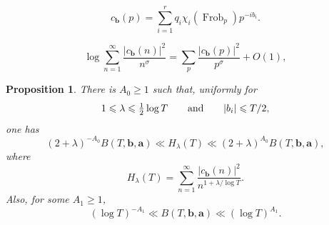 \documentclass[10pt,a4paper]{amsart}
\newtheorem{prop}{Proposition}
\DeclareMathOperator{\Frob}{Frob}
\renewcommand{\ge}{\geqslant}
\renewcommand{\le}{\leqslant}
\begin{document}
\begin{equation}\label{eq:first-prime-coefficient}
c_{\mathbf b}(p)=
\sum_{i=1}^r q_i\chi_i(\Frob_p)p^{-ib_i}.
\end{equation}

\begin{equation}\label{eq:square-euler-series}
\log\sum_{n=1}^{\infty}
\frac{|c_{\mathbf b}(n)|^2}{n^\sigma}
=\sum_p\frac{|c_{\mathbf b}(p)|^2}{p^\sigma}+O(1),
\end{equation}

\begin{prop}\label{prop:square-series-B}
There is $A_0\ge1$ such that, uniformly for
\begin{equation*}
1\le\lambda\le\tfrac12\log T
\qquad\hbox{and}\qquad |b_i|\le T/2,
\end{equation*}
one has
\begin{equation}\label{eq:H-lambda-comparison}
(2+\lambda)^{-A_0}B(T,\mathbf b,\mathbf a)
\ll H_\lambda(T)
\ll(2+\lambda)^{A_0}B(T,\mathbf b,\mathbf a),
\end{equation}
where
\begin{equation}\label{eq:H-lambda-definition}
H_\lambda(T)=\sum_{n=1}^{\infty}
\frac{|c_{\mathbf b}(n)|^2}{n^{1+\lambda/\log T}}.
\end{equation}
Also, for some $A_1\ge1$,
\begin{equation}\label{eq:B-poly}
(\log T)^{-A_1}\ll B(T,\mathbf b,\mathbf a)
\ll(\log T)^{A_1}.
\end{equation}
\end{prop}
\end{document}
